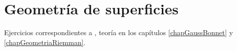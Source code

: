 
\section{Geometría de superficies}

Ejercicios correspondientes a \cite[Capítulo 5]{doCarmo94}, teoría en los capítulos \ref{chapGaussBonnet} y \ref{chapGeometriaRiemman}.

